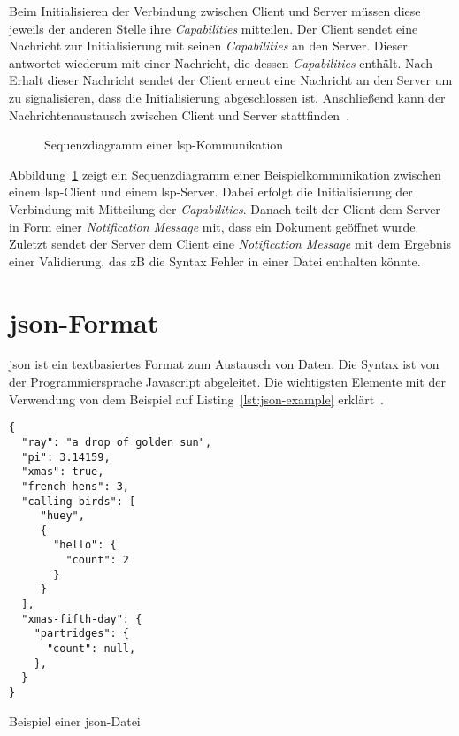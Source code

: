 Beim Initialisieren der Verbindung zwischen Client und Server müssen diese jeweils der anderen Stelle ihre \textit{Capabilities} mitteilen.
Der Client sendet eine Nachricht zur Initialisierung mit seinen \textit{Capabilities} an den Server.
Dieser antwortet wiederum mit einer Nachricht, die dessen \textit{Capabilities} enthält.
Nach Erhalt dieser Nachricht sendet der Client erneut eine Nachricht an den Server um zu signalisieren, dass die Initialisierung abgeschlossen ist.
Anschließend kann der Nachrichtenaustausch zwischen Client und Server stattfinden~\cite{lsp-microsoft,lsp-medium}.

\begin{figure}[htp] %
      \centering
      \caption{Sequenzdiagramm einer \acs{lsp}-Kommunikation}
      \label{fig:lsp-sequence-diagram}
\end{figure}

Abbildung~\ref{fig:lsp-sequence-diagram} zeigt ein Sequenzdiagramm einer Beispielkommunikation zwischen einem \ac{lsp}-Client und einem \ac{lsp}-Server.
Dabei erfolgt die Initialisierung der Verbindung mit Mitteilung der \textit{Capabilities}.
Danach teilt der Client dem Server in Form einer \textit{Notification Message} mit, dass ein Dokument geöffnet wurde.
Zuletzt sendet der Server dem Client eine \textit{Notification Message} mit dem Ergebnis einer Validierung, das \acs{zB} die Syntax Fehler in einer Datei enthalten könnte.


\section{\acs{json}-Format}\label{sec:json-format}

\ac{json} ist ein textbasiertes Format zum Austausch von Daten. Die Syntax ist von der Programmiersprache Javascript abgeleitet.
Die wichtigsten Elemente mit der Verwendung von dem Beispiel auf Listing~\ref{lst:json-example} erklärt~\cite{json-org,json-developer-mozilla}.

\begin{listing}[htp]
      \begin{verbatim}
{
  "ray": "a drop of golden sun",
  "pi": 3.14159,
  "xmas": true,
  "french-hens": 3,
  "calling-birds": [
     "huey",
     {
       "hello": {
         "count": 2
       }
     }    
  ],
  "xmas-fifth-day": {
    "partridges": {
      "count": null,
    },
  }
}
      \end{verbatim}
      \caption{Beispiel einer \acs{json}-Datei}
      \label{lst:json-example}
\end{listing}

